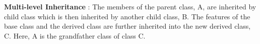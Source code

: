 {{{		
		
	 \item \textbf{Multi-level Inheritance} : The members of the parent class, A, are inherited by child class which is then inherited by another child class, B. The features of the base class and the derived class are further inherited into the new derived class, C. Here, A is the grandfather class of class C.
        
}}}
